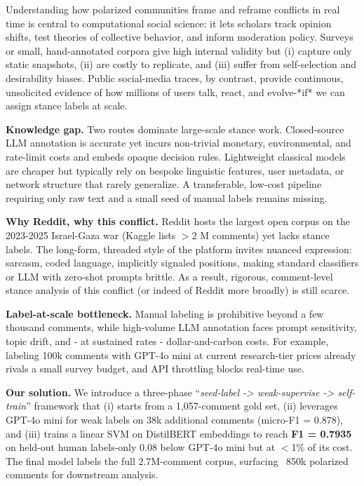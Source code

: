 \documentclass[letterpaper]{article} %
\begin{document}
Understanding how polarized communities frame and reframe conflicts in real time is central to computational social science: it lets scholars track opinion shifts, test theories of collective behavior, and inform moderation policy. Surveys or small, hand-annotated corpora give high internal validity but (i) capture only static snapshots, (ii) are costly to replicate, and (iii) suffer from self-selection and desirability biases.  Public social-media traces, by contrast, provide continuous, unsolicited evidence of how millions of users talk, react, and evolve-*if* we can assign stance labels at scale.

\textbf{Knowledge gap.} Two routes dominate large-scale stance work. Closed-source LLM annotation is accurate yet incurs non-trivial monetary, environmental, and rate-limit costs and embeds opaque decision rules.  Lightweight classical models are cheaper but typically rely on bespoke linguistic features, user metadata, or network structure that rarely generalize. A transferable, low-cost pipeline requiring only raw text and a small seed of manual labels remains missing.

\textbf{Why Reddit, why this conflict.} Reddit hosts the largest open corpus on the 2023-2025 Israel-Gaza war (Kaggle lists $>$2 M comments) yet lacks stance labels.  The long-form, threaded style of the platform invites nuanced expression: sarcasm, coded language, implicitly signaled positions, making standard classifiers or LLM with zero-shot prompts brittle. As a result, rigorous, comment-level stance analysis of this conflict (or indeed of Reddit more broadly) is still scarce.

\textbf{Label-at-scale bottleneck.} Manual labeling is prohibitive beyond a few thousand comments, while high-volume LLM annotation faces prompt sensitivity, topic drift, and - at sustained rates - dollar-and-carbon costs.  For example, labeling 100k comments with GPT-4o mini at current research-tier prices already rivals a small survey budget, and API throttling blocks real-time use.

\textbf{Our solution.} We introduce a three-phase “\emph{seed-label -> weak-supervise -> self-train}” framework that (i) starts from a 1,057-comment gold set, (ii) leverages GPT-4o mini for weak labels on 38k additional comments (micro-F1 = 0.878), and (iii) trains a linear SVM on DistilBERT embeddings to reach \textbf{F1 = 0.7935} on held-out human labels-only 0.08 below GPT-4o mini but at $<$1\% of its cost.  The final model labels the full 2.7M-comment corpus, surfacing ~850k polarized comments for downstream analysis.
\end{document}

